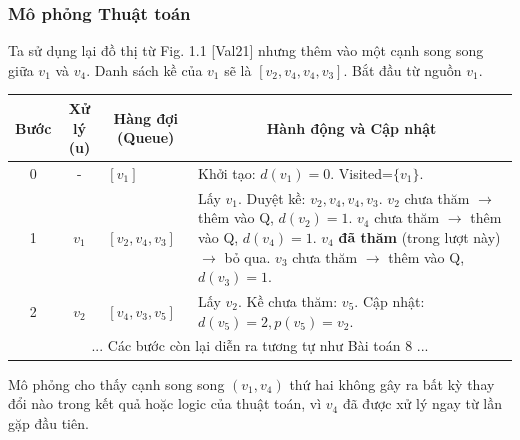 \documentclass[a4paper,12pt]{article}
\begin{document}
\subsubsection{Mô phỏng Thuật toán}
Ta sử dụng lại đồ thị từ Fig. 1.1 [Val21] nhưng thêm vào một cạnh song song giữa $v_1$ và $v_4$. Danh sách kề của $v_1$ sẽ là $[v_2, v_4, v_4, v_3]$. Bắt đầu từ nguồn $v_1$.
\begin{center}
\renewcommand{\arraystretch}{1.5}
\begin{tabular}{|c|c|l|p{6cm}|}
\hline
\textbf{Bước} & \textbf{Xử lý (u)} & \multicolumn{1}{c|}{\textbf{Hàng đợi (Queue)}} & \multicolumn{1}{c|}{\textbf{Hành động và Cập nhật}} \\ \hline
0 & - & $[v_1]$ & Khởi tạo: $d(v_1)=0$. Visited=$\{v_1\}$. \\ \hline
1 & $v_1$ & $[v_2, v_4, v_3]$ & Lấy $v_1$. Duyệt kề: $v_2, v_4, v_4, v_3$. \newline $v_2$ chưa thăm $\rightarrow$ thêm vào Q, $d(v_2)=1$. \newline $v_4$ chưa thăm $\rightarrow$ thêm vào Q, $d(v_4)=1$. \newline $v_4$ \textbf{đã thăm} (trong lượt này) $\rightarrow$ bỏ qua. \newline $v_3$ chưa thăm $\rightarrow$ thêm vào Q, $d(v_3)=1$. \\ \hline
2 & $v_2$ & $[v_4, v_3, v_5]$ & Lấy $v_2$. Kề chưa thăm: $v_5$. \newline Cập nhật: $d(v_5)=2, p(v_5)=v_2$. \\ \hline
\multicolumn{4}{|c|}{... Các bước còn lại diễn ra tương tự như Bài toán 8 ...} \\ \hline
\end{tabular}
\end{center}
Mô phỏng cho thấy cạnh song song $(v_1, v_4)$ thứ hai không gây ra bất kỳ thay đổi nào trong kết quả hoặc logic của thuật toán, vì $v_4$ đã được xử lý ngay từ lần gặp đầu tiên.
\end{document}
